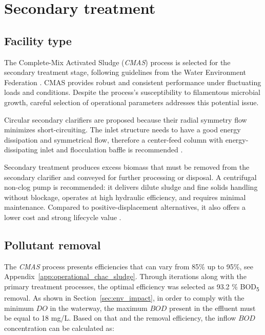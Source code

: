 \documentclass[11pt]{article}
\begin{document}
\section{Secondary treatment}
\label{sec:secondary_trat}

\subsection{Facility type}
\label{sec:sec_treat_facility_type}

The Complete-Mix Activated Sludge (\textit{CMAS}) 
process is selected for the secondary treatment stage, 
following guidelines from the Water Environment Federation \cite{wef_DesignWaterResource}. 
CMAS provides robust and consistent performance under fluctuating loads and conditions. 
Despite the process’s susceptibility to filamentous microbial growth, careful selection of 
operational parameters addresses this potential issue.

Circular secondary clarifiers are proposed because 
their radial symmetry flow minimizes short-circuiting. 
The inlet structure needs to have a good energy dissipation 
and symmetrical flow, therefore a center-feed column with 
energy-dissipating inlet and flocculation baffle 
is recommended \cite{davis2010water}.

Secondary treatment produces excess biomass that 
must be removed from the secondary clarifier and 
conveyed for further processing or disposal. 
A centrifugal non-clog pump is recommended: it 
delivers dilute sludge and fine solids handling 
without blockage, operates at high hydraulic efficiency, 
and requires minimal maintenance. Compared to 
positive-displacement alternatives, it also offers 
a lower cost and strong lifecycle value \cite{davis2010water}.

\subsection{Pollutant removal}
\label{sec:sec_tret_polluntant_removal}

The \textit{CMAS} process presents efficiencies that can vary 
from 85\% up to 95\%, see Appendix~\ref{app:operational_chac_sludge}. Through 
iterations along with the primary treatment processes, the optimal efficiency 
was selected as 
93.2
\% BOD\textsubscript{5} removal. 
As shown in Section~\ref{sec:env_impact}, in order to comply with 
the minimum $DO$ in the waterway, the maximum $BOD$ present 
in the effluent must be equal to  
18
mg/L. Based on that and the removal efficiency, the inflow $BOD$ 
concentration can be calculated as:
\end{document}
